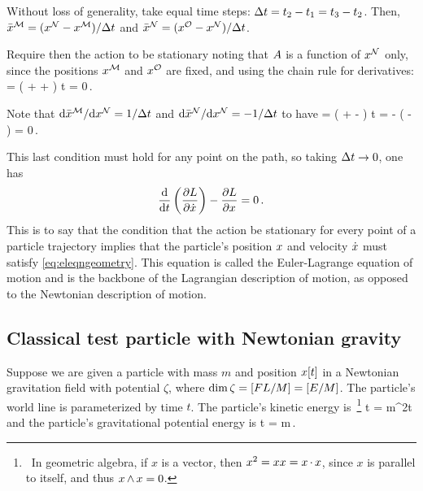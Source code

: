 Without loss of generality, take equal time steps: $\Delta t = t_2 - t_1 = t_3 - t_2$. Then, ${\bar{x}}^{\mathcal{M}} = ({x}^{\mathcal{N}} - {x}^{\mathcal{M}})/\Delta t$ and ${\bar{x}}^{\mathcal{N}} = ({x}^{\mathcal{O}} - {x}^{\mathcal{N}})/\Delta t$.

Require then the action to be stationary noting that $A$ is a function of ${x}^{\mathcal{N}}$ only, since the positions ${x}^{\mathcal{M}}$ and ${x}^{\mathcal{O}}$ are fixed, and using the chain rule for derivatives:
\beq
{} 
    = \left( 
      + 
      +  
      \right) \diff t = 0\,.
\eeq

Note that $\text{d}{\bar{x}}^{\mathcal{M}}/\text{d}{x}^{\mathcal{N}} = 1/\Delta t$ and $\text{d}{\bar{x}}^{\mathcal{N}}/\text{d}{x}^{\mathcal{N}} = -1/\Delta t$ to have
\beq
{} 
    = \left( 
      + 
      -  
      \right) \diff t 
    = 
      - 
      \left( 
      -
      \right)
    = 0\,.
\eeq

This last condition must hold for any point on the path, so taking $\Delta t\to 0$, one has
\begin{equation}\label{eq:eleqngeometry}
\dfrac{\text{d}{}}{\text{d}{t}} \left(\dfrac{\partial{L}}{\partial{{\dot{x}}^{}}}\right) - \dfrac{\partial{L}}{\partial{{x}^{}}} = 0\,.
\end{equation}
This is to say that the condition that the action be stationary for every point of a particle trajectory implies that the particle's position $x$ and velocity $\dot{x}$ must satisfy \cref{eq:eleqngeometry}. This equation is called the Euler-Lagrange equation of motion and is the backbone of the Lagrangian description of motion, as opposed to the Newtonian description of motion.


\subsection{Classical test particle with Newtonian gravity}
Suppose we are given a particle with mass $m$ and position $x\!\left[{t}\right]$ in a Newtonian gravitation field with potential $\zeta$, where $\dim\zeta = \left[{FL/M}\right] = \left[{E/M}\right]$. The particle's world line is parameterized by time $t$. The particle's kinetic energy is~\footnote{~In geometric algebra, if $x$ is a vector, then $x^2 = xx = x\operatorname{\cdot} x$, since $x$ is parallel to itself, and thus $x\operatorname{\wedge} x = 0$.}
\beq
\ken\vat t = m\dt\pvec^2\vat t
\eeq
and the particle's gravitational potential energy is
\beq
\pen\vat t = m\zeta{}\,.
\eeq

